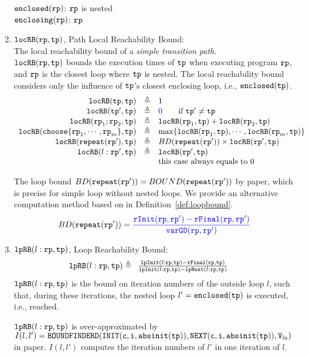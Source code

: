 \begin{enumerate}
%
      $\mathtt{enclosed}(\mathtt{rp})$:  $\mathtt{rp}$ is nested
      \\
      $\mathtt{enclosing}(\mathtt{rp})$:  $\mathtt{rp}$
%
\item $\mathtt{locRB}(\mathtt{rp}, \mathtt{tp})$, Path Local Reachability Bound:
\\
The local reachability bound of a \emph{simple transition path}. 
\\
$\mathtt{locRB}(\mathtt{rp}, \mathtt{tp})$ bounds the execution times of $\mathtt{tp}$ when executing program $\mathtt{rp}$,
and $\mathtt{rp}$ is the closest loop where $\mathtt{tp}$ is nested.
The local reachability bound  considers only the influence of $\mathtt{tp}$'s closest enclosing loop, i.e., $\mathtt{enclosed}(\mathtt{tp})$.
%
\[
  \begin{array}{rcl}
    \outinB(\tpath, \tpath) & \triangleq & 1 \\
    \outinB(\tpath', \tpath) & \triangleq & \highlight{0} \qquad \text{if } \tpath' \neq \tpath\\
    \outinB(\rprog_1;\rprog_2, \tpath) & \triangleq & \outinB(\rprog_1, \tpath) + \outinB(\rprog_2, \tpath) \\
    \outinB(\rpchoose{\rprog_1, \cdots, \rprog_m }, \tpath) & \triangleq 
    & \max\left\{ \outinB(\rprog_1, \tpath), \cdots, \outinB(\rprog_m, \tpath) \right\} \\
    \outinB(\rprepeat(\rprog'), \tpath) & \triangleq 
    & BD(\rprepeat(\rprog'))
     \times \outinB(\rprog', \tpath)
     \\
    \outinB(l: \rprog', \tpath) & \triangleq & \outinB(\rprog', \tpath) \\
    &  & \text{this case always equals to } 0 \\
  \end{array}
  \]

  The loop bound $BD(\mathtt{repeat}(\mathtt{rp}')) = BOUND(\mathtt{repeat}(\mathtt{rp}'))$ by paper\cite{GulwaniJK09}, which is precise for simple loop without nested loops. 
  We provide an alternative computation method based on \cite{sinn2017complexity} in Definition~\ref{def:loopbound}.
  \[
    BD(\rprepeat(\rprog')) = \highlight{\frac{\rfinit(\rprog, \rprog') - \rffinal(\rprog, \rprog')}{\varGD(\rprog, \rprog')}}
\]
      \item $\mathtt{lpRB}(l: \mathtt{rp}, \mathtt{tp})$,
      {Loop Reachability Bound}:
      \[
        \mathtt{lpRB}(l: \mathtt{rp}, \mathtt{tp}) \triangleq
        \begin{array}{ll}
          \frac{\mathtt{lpInit}(l: \mathtt{rp}, \mathtt{tp}) - \mathtt{rFinal}(\mathtt{rp}, \mathtt{tp})}{\mathtt{lpInit}(l: \mathtt{rp}, \mathtt{tp}) - \mathtt{lpNext}(l: \mathtt{rp}, \mathtt{tp})}
          & 
        \end{array}
        \]
        $\mathtt{lpRB}(l: \mathtt{rp}, \mathtt{tp})$
        is the bound on iteration numbers of the outside loop $l$,
        such that,
        during these iterations, the nested loop $l' = \mathtt{enclosed(\mathtt{tp})}$ is executed, i.e., reached.
        
        $\mathtt{lpRB}(l:\mathtt{rp}, \mathtt{tp})$ is over-approximated by
        $I(l, l') = \mathtt{BOUNDFINDERD(INIT(c, i, \mathtt{abs}{\mathtt{init}}(\mathtt{tp})), NEXT(c, i, \mathtt{abs}{\mathtt{init}}(\mathtt{tp})), V_{\ln})}$ in paper\cite{GulwaniJK09}.
        $I(l, l')$ computes the iteration numbers of $l'$ in one iteration of $l$.
\end{enumerate}